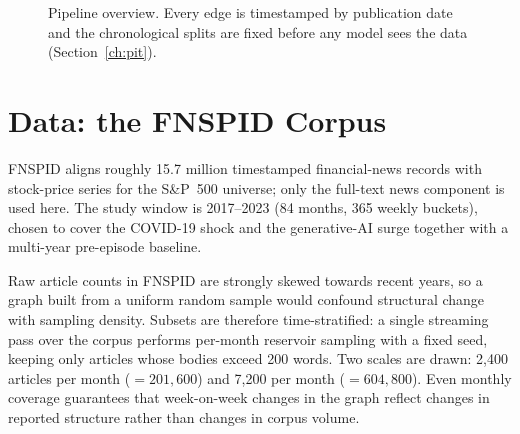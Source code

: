\documentclass[a4paper,12pt]{report}
\begin{document}
\begin{figure}[ht]
\centering
{}
\caption{Pipeline overview. Every edge is timestamped by publication date and
the chronological splits are fixed before any model sees the data
(Section~\ref{ch:pit}).}
\label{fig:pipeline}
\end{figure}

\section{Data: the FNSPID Corpus}
FNSPID \citep{Dong2024FNSPID} aligns roughly 15.7 million timestamped
financial-news records with stock-price series for the S\&P~500 universe; only
the full-text news component is used here. The study window is 2017--2023 (84
months, 365 weekly buckets), chosen to cover the COVID-19 shock and the
generative-AI surge together with a multi-year pre-episode baseline.

Raw article counts in FNSPID are strongly skewed towards recent years, so a
graph built from a uniform random sample would confound structural change with
sampling density. Subsets are therefore time-stratified: a single
streaming pass over the corpus performs per-month reservoir sampling
\citep{Vitter1985Reservoir} with a fixed seed, keeping only articles whose
bodies exceed 200 words. Two scales are drawn: 2{,}400 articles per month
($=201{,}600$) and 7{,}200 per month ($=604{,}800$). Even monthly coverage
guarantees that week-on-week changes in the graph reflect changes in reported
structure rather than changes in corpus volume.
\end{document}
